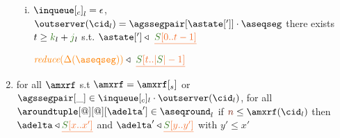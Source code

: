 \begin{definition}
\begin{enumerate}
\begin{enumerate}[i.]
     \item ${\inclient}_l = \epsilon$,  $\outserver(\cid_l) = \agssegpair[{\astate[']}]\cdot \aseqseg$ there exists $t \geq \tknown_l+\treceivebuffer_l $ s.t.
		      $\astate['] \triangleleft \ \flatten{\queuemessage[0 .. t - 1]}$ %
     
       		$\ireduce{\igetdeltas{\aseqseg}}\triangleleft \ \flatten{ \queuemessage[t..|\queuemessage| - 1]}$  
    \end{enumerate}	
	
        \item \label{prop_deltas} for all $\amxrf$ s.t $\amxrf = \amxrf[_s]$ or $\agssegpair[\_]\in\inclient_l\cdot\outserver(\cid_l)$, %
		for all $\aroundtuple[@][@][\adelta'] \in\pending_l$
        if $\irounds\leq\amxrf(\cid_l)$ then $\adelta\triangleleft \flatten{\queuemessage[x..x']}$ and  $\adelta'\triangleleft \flatten{\queuemessage[y..y']}$
        with $y'\leq x'$
    

\end{enumerate}
	
\end{definition}


